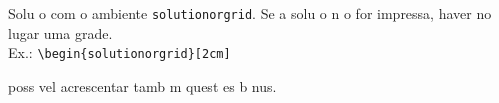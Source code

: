 \documentclass{article}
\begin{document}
\begin{questions}
\begin{solutionordottedlines}
			\end{solutionordottedlines}
			\begin{solutionorgrid}
				Solu o com o ambiente \texttt{solutionorgrid}. Se a solu o n o for impressa, haver  no lugar uma grade.\\
                Ex.: \verb*|\begin{solutionorgrid}[2cm]|
			\end{solutionorgrid}
		\bonusquestion[1]
		  poss vel acrescentar tamb m quest es b nus.
	\end{questions}
\end{document}

